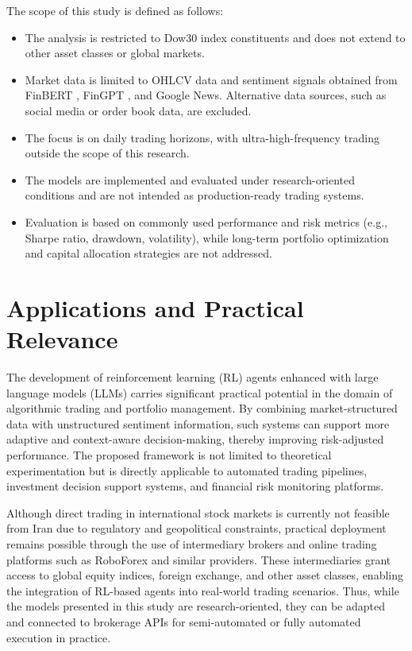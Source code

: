 \documentclass[12pt,a4paper]{report}
\begin{document}
The scope of this study is defined as follows:

\begin{itemize}
    \item The analysis is restricted to Dow30 index constituents and does not extend to other asset classes or global markets.
    \item Market data is limited to OHLCV data and sentiment signals obtained from FinBERT \cite{araci2019finbert}, FinGPT \cite{yang2023fingpt}, and Google News. Alternative data sources, such as social media or order book data, are excluded.
    \item The focus is on daily trading horizons, with ultra-high-frequency trading outside the scope of this research.
    \item The models are implemented and evaluated under research-oriented conditions and are not intended as production-ready trading systems.
    \item Evaluation is based on commonly used performance and risk metrics (e.g., Sharpe ratio, drawdown, volatility), while long-term portfolio optimization and capital allocation strategies are not addressed.
\end{itemize}


\section{Applications and Practical Relevance}

The development of reinforcement learning (RL) agents enhanced with large language models (LLMs) carries significant practical potential in the domain of algorithmic trading and portfolio management. By combining market-structured data with unstructured sentiment information, such systems can support more adaptive and context-aware decision-making, thereby improving risk-adjusted performance. The proposed framework is not limited to theoretical experimentation but is directly applicable to automated trading pipelines, investment decision support systems, and financial risk monitoring platforms.

Although direct trading in international stock markets is currently not feasible from Iran due to regulatory and geopolitical constraints, practical deployment remains possible through the use of intermediary brokers and online trading platforms such as RoboForex and similar providers. These intermediaries grant access to global equity indices, foreign exchange, and other asset classes, enabling the integration of RL-based agents into real-world trading scenarios. Thus, while the models presented in this study are research-oriented, they can be adapted and connected to brokerage APIs for semi-automated or fully automated execution in practice.
\end{document}
